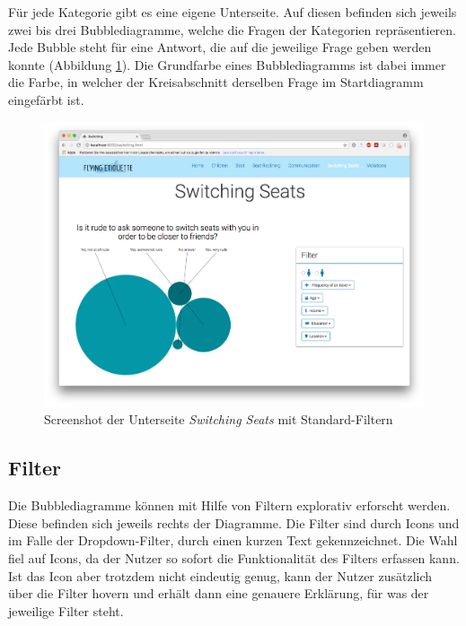 \documentclass{mi-seminar}
\begin{document}
Für jede Kategorie gibt es eine eigene Unterseite. Auf diesen befinden sich jeweils zwei bis drei Bubblediagramme, welche die Fragen der Kategorien repräsentieren. Jede Bubble steht für eine Antwort, die auf die jeweilige Frage geben werden konnte (Abbildung \ref{ScSwitchingSeats}). 
Die Grundfarbe eines Bubblediagramms ist dabei immer die Farbe, in welcher der Kreisabschnitt derselben Frage im Startdiagramm eingefärbt ist.
\begin{figure}[h]
\includegraphics[scale=0.5]{assets/filter_standard.png}
\caption{Screenshot der Unterseite \textit{Switching Seats} mit Standard-Filtern}
\label{ScSwitchingSeats}
\end{figure}

\subsection{Filter}
Die Bubblediagramme können mit Hilfe von Filtern explorativ erforscht werden. Diese befinden sich jeweils rechts der Diagramme. Die Filter sind durch Icons und im Falle der Dropdown-Filter, durch einen kurzen Text gekennzeichnet. Die Wahl fiel auf Icons, da der Nutzer so sofort die Funktionalität des Filters erfassen kann. Ist das Icon aber trotzdem nicht eindeutig genug, kann der Nutzer zusätzlich über die Filter hovern und erhält dann eine genauere Erklärung, für was der jeweilige Filter steht. 
\end{document}
